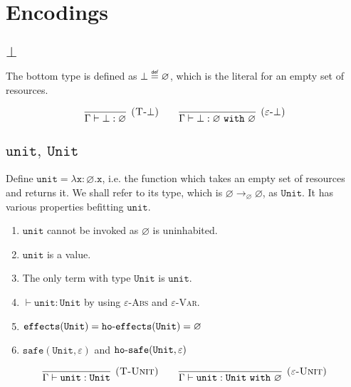 \documentclass{llncs}
\newcommand{\keywadj}[1]{\mathtt{#1}}
\newcommand{\keyw}[1]{\keywadj{#1}~}
\newcommand{\kw}[1]{\keyw{ #1 }}
\newcommand{\kwa}[1]{\keywadj{ #1 }}
\newcommand{\hyphen}{\hbox{-}}
\newcommand{\unit}[0]{ \kwa{unit} }
\newcommand{\Unit}[0]{ \kwa{Unit} }
\newcommand\defn{\mathrel{\overset{\makebox[0pt]{\mbox{\normalfont\tiny\sffamily def}}}{=}}}
\begin{document}
\section{Encodings}

\subsection{$\bot$}
The bottom type is defined as $\kwa{\bot \defn \varnothing}$, which is the literal for an empty set of resources.

\[
\begin{array}{c}


\infer[\textsc{(T-$\bot$)}]
	{\Gamma \vdash \bot : \varnothing}
	{}
~~~~~~
\infer[\textsc{($\varepsilon$-$\bot$)}]
	{\Gamma \vdash \bot : \varnothing~\kw{with} \varnothing}
	{}

\end{array}
\]

\subsection{$\unit,~\Unit$}

\noindent
Define $\kwa{unit = \lambda x: \varnothing.x}$, i.e. the function which takes an empty set of resources and returns it. We shall refer to its type, which is $\kwa{\varnothing \rightarrow_{\varnothing} \varnothing}$, as $\Unit$. It has various properties befitting $\unit$.

\begin{enumerate}
	\item $\unit$ cannot be invoked as $\varnothing$ is uninhabited.
	\item $\unit$ is a value.
	\item The only term with type $\Unit$ is $\unit$.
	\item $\vdash \unit : \Unit$ by using \textsc{$\varepsilon$-Abs} and \textsc{$\varepsilon$-Var}.
	\item $\kwa{effects}(\Unit) = \kwa{ho \hyphen effects}(\Unit) = \varnothing$
	\item $\kwa{safe}(\Unit, \varepsilon)$ and $\kwa{ho \hyphen safe}(\Unit, \varepsilon)$
\end{enumerate}

\[
\begin{array}{c}


\infer[\textsc{(T-Unit)}]
	{\Gamma \vdash \unit: \Unit}
	{}
~~~~~~
\infer[\textsc{($\varepsilon$-Unit)}]
	{\Gamma \vdash \unit: \Unit~\kw{with} \varnothing}
	{}

\end{array}
\]
\end{document}
